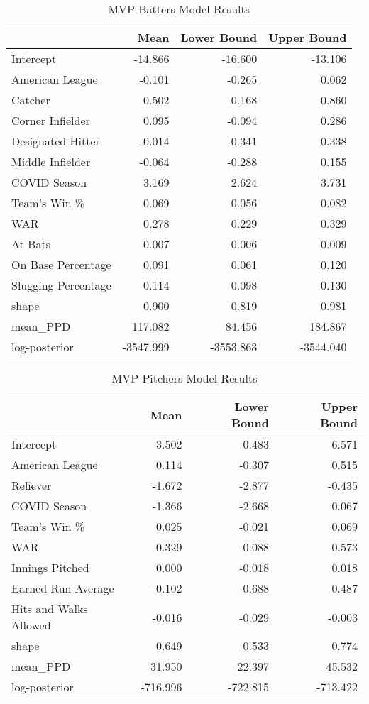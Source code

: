 \documentclass[
]{article}
\begin{document}
\begin{table}[H]

\caption{\label{tab:batter-results}MVP Batters Model Results}
\centering
\begin{tabular}[t]{l|r|r|r}
\hline
  & Mean & Lower Bound & Upper Bound\\
\hline
Intercept & -14.866 & -16.600 & -13.106\\
\hline
American League & -0.101 & -0.265 & 0.062\\
\hline
Catcher & 0.502 & 0.168 & 0.860\\
\hline
Corner Infielder & 0.095 & -0.094 & 0.286\\
\hline
Designated Hitter & -0.014 & -0.341 & 0.338\\
\hline
Middle Infielder & -0.064 & -0.288 & 0.155\\
\hline
COVID Season & 3.169 & 2.624 & 3.731\\
\hline
Team's Win \% & 0.069 & 0.056 & 0.082\\
\hline
WAR & 0.278 & 0.229 & 0.329\\
\hline
At Bats & 0.007 & 0.006 & 0.009\\
\hline
On Base Percentage & 0.091 & 0.061 & 0.120\\
\hline
Slugging Percentage & 0.114 & 0.098 & 0.130\\
\hline
shape & 0.900 & 0.819 & 0.981\\
\hline
mean\_PPD & 117.082 & 84.456 & 184.867\\
\hline
log-posterior & -3547.999 & -3553.863 & -3544.040\\
\hline
\end{tabular}
\end{table}

\begin{table}[H]

\caption{\label{tab:pitcher-results}MVP Pitchers Model Results}
\centering
\begin{tabular}[t]{l|r|r|r}
\hline
  & Mean & Lower Bound & Upper Bound\\
\hline
Intercept & 3.502 & 0.483 & 6.571\\
\hline
American League & 0.114 & -0.307 & 0.515\\
\hline
Reliever & -1.672 & -2.877 & -0.435\\
\hline
COVID Season & -1.366 & -2.668 & 0.067\\
\hline
Team's Win \% & 0.025 & -0.021 & 0.069\\
\hline
WAR & 0.329 & 0.088 & 0.573\\
\hline
Innings Pitched & 0.000 & -0.018 & 0.018\\
\hline
Earned Run Average & -0.102 & -0.688 & 0.487\\
\hline
Hits and Walks Allowed & -0.016 & -0.029 & -0.003\\
\hline
shape & 0.649 & 0.533 & 0.774\\
\hline
mean\_PPD & 31.950 & 22.397 & 45.532\\
\hline
log-posterior & -716.996 & -722.815 & -713.422\\
\hline
\end{tabular}
\end{table}
\end{document}
